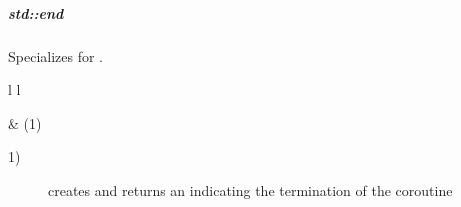 \subparagraph*{std::end}
Specializes  for \pushcoro.

\begin{tabular}{ l l }
    \midrule

     & (1)\\

    \midrule
\end{tabular}

\begin{description}
    \item[1)] creates and returns an  indicating the termination of the coroutine
\end{description}
